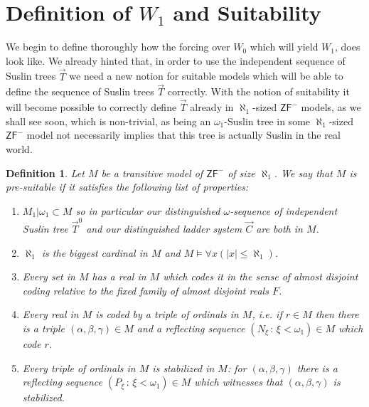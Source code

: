 \documentclass[a4paper,11pt]{article}
\newtheorem{definition}[theorem]{Definition}
\newcommand{\ZFP}{\mathsf{ZF}^-}
\begin{document}
\section{Definition of $W_1$ and Suitability}
We begin to define thoroughly how the forcing over $W_0$ which will yield $W_1$, does look like. 
We already hinted that, in order to use the independent sequence of Suslin trees $\vec{T}$ we need a new notion for suitable models which
will be able to define the sequence of Suslin trees $\vec{T}$ correctly. 
With the notion of suitability it will become possible 
to correctly define $\vec{T}$ already in $\aleph_1$-sized $\ZFP$ models,
as we shall see soon, which is non-trivial, as being an $\omega_1$-Suslin tree in some $\aleph_1$-sized $\ZFP$ model not necessarily implies that this tree is actually Suslin in the real world.
\begin{definition}
 Let $M$ be a transitive model of $\ZFP$ of size $\aleph_1$. We say that $M$ is pre-suitable if it satisfies the 
 following list of properties:
 \begin{enumerate}
  \item $M_1 | \omega_1 \subset M$ so in particular our distinguished $\omega$-sequence of independent Suslin tree $\vec{T}^0$ and our distinguished ladder system $\vec{C}$ are both in $M$.
  \item $\aleph_1$ is the biggest cardinal in $M$ and $M \models \forall x (|x|\le \aleph_1)$.
  \item Every set in $M$ has a real in $M$ which codes it in the sense of almost disjoint coding
  relative to the fixed family of almost disjoint reals $F$.
  \item Every real in $M$ is coded by a triple of ordinals in $M$, i.e. 
  if $r \in M$ then there is a triple $(\alpha, \beta, \gamma) \in M$ and a reflecting
  sequence $(N_{\xi} \, : \, \xi < \omega_1)\in M$ which code $r$.
  \item Every triple of ordinals in $M$ is stabilized in $M$: for $(\alpha, \beta, \gamma)$
  there is a reflecting sequence $(P_{\xi} \, : \, \xi < \omega_1) \in M$ which witnesses that
  $(\alpha, \beta, \gamma)$ is stabilized.
 \end{enumerate}

\end{definition}
\end{document}

